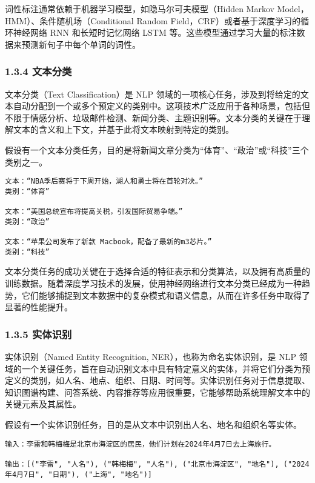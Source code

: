 \documentclass[
]{article}
\begin{document}
词性标注通常依赖于机器学习模型，如隐马尔可夫模型（Hidden Markov
Model，HMM）、条件随机场（Conditional Random
Field，CRF）或者基于深度学习的循环神经网络 RNN 和长短时记忆网络 LSTM
等。这些模型通过学习大量的标注数据来预测新句子中每个单词的词性。

\subsubsection{1.3.4 文本分类}\label{ux6587ux672cux5206ux7c7b}

文本分类（Text Classification）是 NLP
领域的一项核心任务，涉及到将给定的文本自动分配到一个或多个预定义的类别中。这项技术广泛应用于各种场景，包括但不限于情感分析、垃圾邮件检测、新闻分类、主题识别等。文本分类的关键在于理解文本的含义和上下文，并基于此将文本映射到特定的类别。

假设有一个文本分类任务，目的是将新闻文章分类为``体育''、``政治''或``科技''三个类别之一。

\begin{verbatim}
文本：“NBA季后赛将于下周开始，湖人和勇士将在首轮对决。”
类别：“体育”

文本：“美国总统宣布将提高关税，引发国际贸易争端。”
类别：“政治”

文本：“苹果公司发布了新款 Macbook，配备了最新的m3芯片。”
类别：“科技”
\end{verbatim}

文本分类任务的成功关键在于选择合适的特征表示和分类算法，以及拥有高质量的训练数据。随着深度学习技术的发展，使用神经网络进行文本分类已经成为一种趋势，它们能够捕捉到文本数据中的复杂模式和语义信息，从而在许多任务中取得了显著的性能提升。

\subsubsection{1.3.5 实体识别}\label{ux5b9eux4f53ux8bc6ux522b}

实体识别（Named Entity Recognition, NER），也称为命名实体识别，是 NLP
领域的一个关键任务，旨在自动识别文本中具有特定意义的实体，并将它们分类为预定义的类别，如人名、地点、组织、日期、时间等。实体识别任务对于信息提取、知识图谱构建、问答系统、内容推荐等应用很重要，它能够帮助系统理解文本中的关键元素及其属性。

假设有一个实体识别任务，目的是从文本中识别出人名、地名和组织名等实体。

\begin{verbatim}
输入：李雷和韩梅梅是北京市海淀区的居民，他们计划在2024年4月7日去上海旅行。

输出：[("李雷", "人名"), ("韩梅梅", "人名"), ("北京市海淀区", "地名"), ("2024年4月7日", "日期"), ("上海", "地名")]
\end{verbatim}
\end{document}

